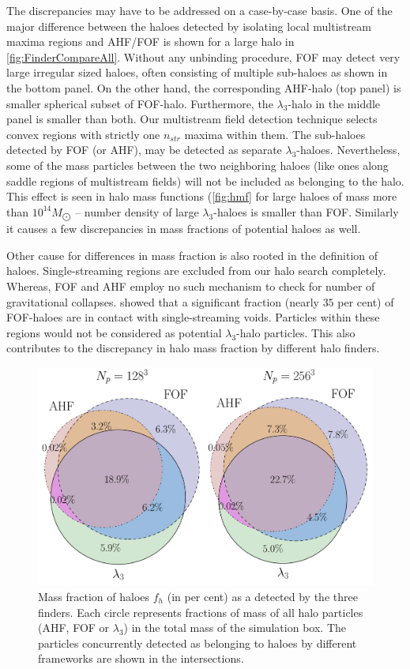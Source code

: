 \documentclass[fleqn,usenatbib,useAMS]{mnras}
\begin{document}
The discrepancies may have to be addressed on a case-by-case basis. One of the major difference between the haloes detected by isolating local multistream maxima regions and AHF/FOF is shown for a large halo in \autoref{fig:FinderCompareAll}. Without any unbinding procedure, FOF may detect very large irregular sized haloes, often consisting of multiple sub-haloes as shown in the bottom panel. On the other hand, the corresponding AHF-halo (top panel) is smaller spherical subset of FOF-halo. Furthermore, the $\lambda_3$-halo in the middle panel is smaller than both. Our multistream field detection technique selects convex regions with strictly one $n_{str}$ maxima within them. The sub-haloes detected by FOF (or AHF), may be detected as separate $\lambda_3$-haloes. Nevertheless, some of the mass particles between the two neighboring haloes (like ones along saddle regions of multistream fields) will not be included as belonging to the halo. This effect is seen in halo mass functions (\autoref{fig:hmf} for large haloes of mass more than $10^{14} M_{\bigodot}$ -- number density of large $\lambda_3$-haloes is smaller than FOF. Similarly it causes a few discrepancies in mass fractions of potential haloes as well. 

Other cause for differences in mass fraction is also rooted in the definition of haloes. Single-streaming regions are excluded from our halo search completely. Whereas, FOF and AHF employ no such mechanism to check for number of gravitational collapses. \cite{Ramachandra2015} showed that a significant fraction (nearly $35$ per cent) of FOF-haloes are in contact with single-streaming voids. Particles within these regions would not be considered as potential $\lambda_3$-halo particles. This also contributes to the discrepancy in halo mass fraction by different halo finders. 
 

\begin{figure}
\begin{minipage}[t]{.99\linewidth}
 \centering
 \includegraphics[width=8.cm]{fig13.pdf}
\end{minipage}\hfill
\caption{Mass fraction of haloes $f_h$ (in per cent) as a detected by the three finders. Each circle represents fractions of mass of all halo particles (AHF, FOF or $\lambda_3$) in the total mass of the simulation box. The particles concurrently detected as belonging to haloes by different frameworks are shown in the intersections. }
\label{fig:HaloFinderMF}
\end{figure}
\end{document}

